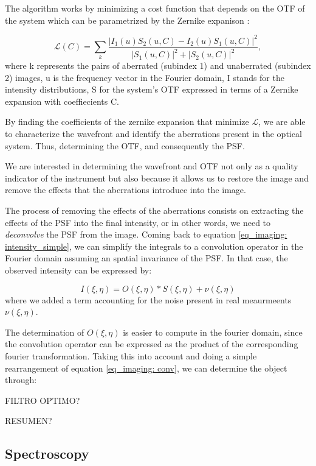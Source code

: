 The algorithm works by minimizing a cost function that depends on the OTF of the system which can be parametrized by the Zernike expanison \citep{pd_cost}: 

\begin{equation}
  \mathcal{L} (C) = \sum _ {k} \frac{|I_1 (u) S_2 (u, C) - I_2(u) S_1(u, C)| ^2}{|S_1(u, C)| ^2 + |S_2(u, C)| ^2} , 
\end{equation}
where k represents the pairs of aberrated (subindex 1) and unaberrated (subindex 2) images, u is the frequency vector in the Fourier domain, I stands for the intensity distributions, S for the system's OTF expressed in terms of a Zernike expansion with coeffiecients C. 

By finding the coefficients of the zernike expansion that minimize $\mathcal{L}$, we are able to characterize the wavefront and identify the aberrations present in the optical system. Thus, determining the OTF, and consequently the PSF. 

We are interested in determining the wavefront and OTF not only as a quality indicator of the instrument but also because it allows us to restore the image and remove the effects that the aberrations introduce into the image. 

The process of removing the effects of the aberrations consists on extracting the effects of the PSF into the final intensity, or in other words, we need to \textit{deconvolve} the PSF from the image. Coming back to equation \eqref{eq_imaging: intensity_simple}, we can simplify the integrals to a convolution operator in the Fourier domain assuming an spatial invariance of the PSF. In that case, the observed intensity can be expressed by:

\begin{equation}
  I(\xi, \eta) = O(\xi, \eta) * S(\xi, \eta) + \nu (\xi, \eta)
  \label{eq_imaging: conv} 
\end{equation}  
where we added a term accounting for the noise present in real meaurmeents $\nu (\xi, \eta)$. 

The determination of $O(\xi, \eta)$ is easier to compute in the fourier domain, since the convolution operator can be expressed as the product of the corresponding fourier transformation. Taking this into account and doing a simple rearrangement of equation \eqref{eq_imaging: conv}, we can determine the object through:

FILTRO OPTIMO?

RESUMEN? 


\subsection{Spectroscopy}

